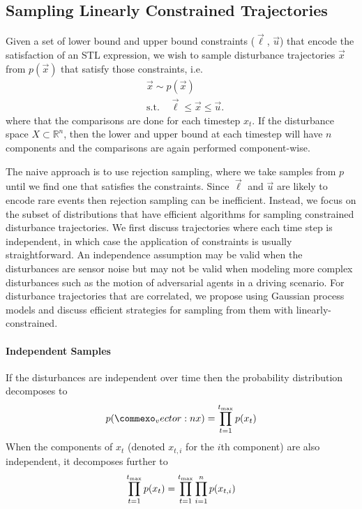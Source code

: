 \subsection{Sampling Linearly Constrained Trajectories}
\label{subsec:gp2}

Given a set of lower bound and upper bound constraints ($\vec{\ell}$, $\vec{u}$) that encode the satisfaction of an STL expression, we wish to sample disturbance trajectories $\vec{x}$ from $p(\vec{x})$ that satisfy those constraints, i.e.
\begin{equation}
\begin{split}
    &\vec{x} \sim p(\vec{x}) \\
    &\text{s.t.} \quad \vec{\ell} \leq \vec{x} \leq \vec{u} \text{.}
    \end{split}
\end{equation}
where that the comparisons are done for each timestep $x_t$. If the disturbance space $X \subset \mathbb{R}^n$, then the lower and upper bound at each timestep will have $n$ components and the comparisons are again performed component-wise.

The naive approach is to use rejection sampling, where we take samples from $p$ until we find one that satisfies the constraints. Since $\vec{\ell}$ and $\vec{u}$ are likely to encode rare events then rejection sampling can be inefficient. Instead, we focus on the subset of distributions that have efficient algorithms for sampling constrained disturbance trajectories. We first discuss trajectories where each time step is independent, in which case the application of constraints is usually straightforward. An independence assumption may be valid when the disturbances are sensor noise but may not be valid when modeling more complex disturbances such as the motion of adversarial agents in a driving scenario. For disturbance trajectories that are correlated, we propose using Gaussian process models and discuss efficient strategies for sampling from them with linearly-constrained.

\paragraph{Independent Samples}
If the disturbances are independent over time then the probability distribution decomposes to
\begin{equation}
    p(\vec{x}) = \prod_{t=1}^{t_{\rm max}} p(x_t)
\end{equation}
When the components of $x_t$ (denoted $x_{t,i}$ for the $i$th component) are also independent, it decomposes further to
\begin{equation}
    \prod_{t=1}^{t_{\rm max}} p(x_t)  = \prod_{t=1}^{t_{\rm max}} \prod_{i=1}^n p(x_{t,i})
\end{equation}

